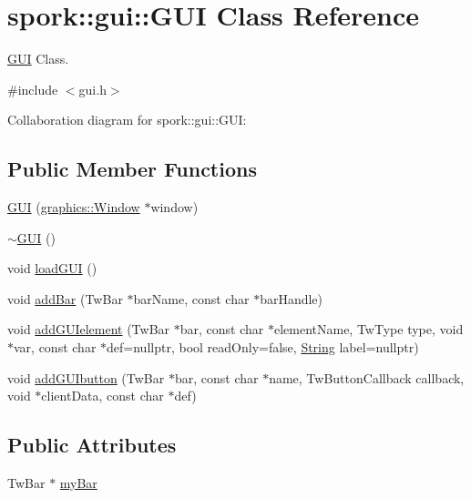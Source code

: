 \hypertarget{classspork_1_1gui_1_1_g_u_i}{}\section{spork\+:\+:gui\+:\+:G\+UI Class Reference}
\label{classspork_1_1gui_1_1_g_u_i}


\hyperlink{classspork_1_1gui_1_1_g_u_i}{G\+UI} Class.  




{\ttfamily \#include $<$gui.\+h$>$}



Collaboration diagram for spork\+:\+:gui\+:\+:G\+UI\+:
\subsection*{Public Member Functions}
\begin{DoxyCompactItemize}
\item 
\hyperlink{classspork_1_1gui_1_1_g_u_i_a28fe6b112dddc8530e2b3df51d3b55b4}{G\+UI} (\hyperlink{classspork_1_1graphics_1_1_window}{graphics\+::\+Window} $\ast$window)
\item 
\hyperlink{classspork_1_1gui_1_1_g_u_i_ab72190104e3a7209b0b59114a0fef862}{$\sim$\+G\+UI} ()
\item 
void \hyperlink{classspork_1_1gui_1_1_g_u_i_a81feb6b378f67372bb0d888a3e8a9a0c}{load\+G\+UI} ()
\item 
void \hyperlink{classspork_1_1gui_1_1_g_u_i_ad931ff397620434803152efafb65f199}{add\+Bar} (Tw\+Bar $\ast$bar\+Name, const char $\ast$bar\+Handle)
\item 
void \hyperlink{classspork_1_1gui_1_1_g_u_i_add55001e7b4f540f80ed915d3588f20f}{add\+G\+U\+Ielement} (Tw\+Bar $\ast$bar, const char $\ast$element\+Name, Tw\+Type type, void $\ast$var, const char $\ast$def=nullptr, bool read\+Only=false, \hyperlink{my_string_8h_afbeda3fd1bdc8c37d01bdf9f5c8274ff}{String} label=nullptr)
\item 
void \hyperlink{classspork_1_1gui_1_1_g_u_i_a2e6dcd5011c7bbe5607c2ec126e5f080}{add\+G\+U\+Ibutton} (Tw\+Bar $\ast$bar, const char $\ast$name, Tw\+Button\+Callback callback, void $\ast$client\+Data, const char $\ast$def)
\end{DoxyCompactItemize}
\subsection*{Public Attributes}
\begin{DoxyCompactItemize}
\item 
Tw\+Bar $\ast$ \hyperlink{classspork_1_1gui_1_1_g_u_i_a3eb1c6aa668d31183967e050bc7bafd0}{my\+Bar}
\end{DoxyCompactItemize}
